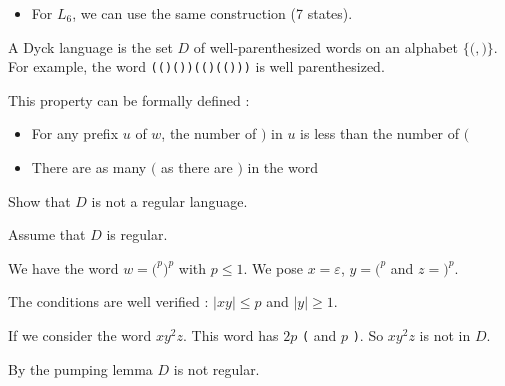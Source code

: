 \documentclass{article}
\theoremstyle{plain}
\begin{document}
\begin{correction}{}{}
\begin{itemize}
\begin{multicols}{2}
        \end{multicols}


      \item For $L_6$, we can use the same construction (7 states).

    \end{itemize}
  \end{correction}


  \exercice A Dyck language is the set $D$ of well-parenthesized words on an
  alphabet $\{\texttt (, \texttt )\}$. For example, the word
  \texttt{(()())(()(()))} is well parenthesized.

  This property can be formally defined :
  \begin{itemize}
    \item For any prefix $u$ of $w$, the number of $)$ in $u$ is less than the
      number of $($
    \item There are as many $($ as there are $)$ in the word
  \end{itemize}
  Show that $D$ is not a regular language.

  \begin{correction}{}{}
    Assume that $D$ is regular.

    We have the word $w = \texttt{(}^p \texttt{)}^p$ with $p \leq 1$.
    We pose $x = \varepsilon$, $y = \texttt(^p$ and $z = \texttt )^p$.

    The conditions are well verified : $|xy| \leq p$ and $|y| \geq 1$.

    If we consider the word $xy^2z$. This word has $2p$ \texttt ( and
    $p$ \texttt ). So $xy^2z$ is not in $D$.

    By the pumping lemma $D$ is not regular.
  \end{correction}
\end{document}
